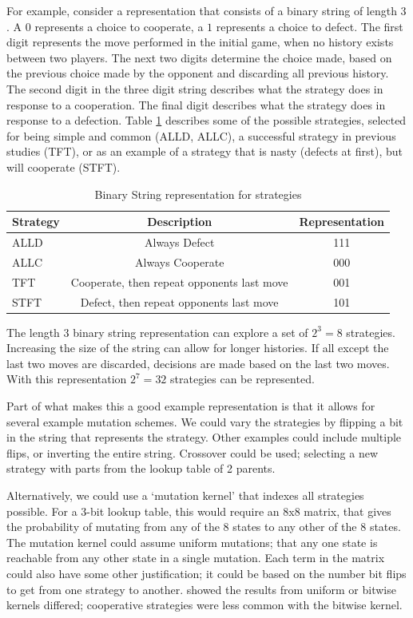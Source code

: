 \documentclass[a4paper,11pt,bcshonoursthesis,singlespace,oneside,thesisdraft,pdflatex]{cssethesis}
\begin{document}
For example, consider a representation that consists of a binary string of length 3 \citep{garcia:PLoSOne:2012}. A $0$ represents a choice to cooperate, a $1$ represents a choice to defect. 
The first digit represents the move performed in the initial game, when no history exists between two players. 
The next two digits determine the choice made, based on the previous choice made by the opponent and discarding all previous history. 
The second digit in the three digit string describes what the strategy does in response to a cooperation. 
The final digit describes what the strategy does in response to a defection. 
Table \ref{table:binaryStrategy} describes some of the possible strategies, selected for being simple and common (ALLD, ALLC), a successful strategy in previous studies (TFT), or as an example of a strategy that is nasty (defects at first), but will cooperate (STFT).

\begin{table}[h]
\centering
\captionsetup{justification=centering}
\begin{tabular}{|l|c|c|}
\hline
 Strategy & Description & Representation\\
\hline
ALLD & Always Defect & 111\\
\hline
ALLC & Always Cooperate & 000\\
\hline
TFT & Cooperate, then repeat opponents last move & 001\\
\hline
STFT & Defect, then repeat opponents last move & 101\\
\hline
\end{tabular}
\caption{Binary String representation for strategies}
\label{table:binaryStrategy}
\end{table}

The length 3 binary string representation can explore a set of $2^3=8$ strategies. Increasing the size of the string can allow for longer histories. 
If all except the last two moves are discarded, decisions are made based on the last two moves. 
With this representation $2^7=32$ strategies can be represented. 

Part of what makes this a good example representation is that it allows for several example mutation schemes. 
We could vary the strategies by flipping a bit in the string that represents the strategy. 
Other examples could include multiple flips, or inverting the entire string. 
Crossover could be used; selecting a new strategy with parts from the lookup table of 2 parents.

Alternatively, we could use a `mutation kernel' that indexes all strategies possible. 
For a 3-bit lookup table, this would require an 8x8 matrix, that gives the probability of mutating from any of the 8 states to any other of the 8 states. 
The mutation kernel could assume uniform mutations; that any one state is reachable from any other state in a single mutation. 
Each term in the matrix could also have some other justification; it could be based on the number bit flips to get from one strategy to another. 
\citet{garcia:PLoSOne:2012} showed the results from uniform or bitwise kernels differed; cooperative strategies were less common with the bitwise kernel. 
\end{document}
